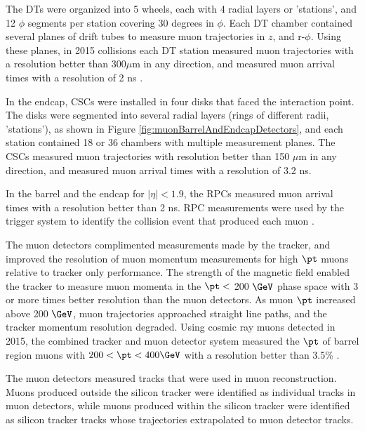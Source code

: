 The DTs were organized into 5 wheels, each with 4 radial layers or 'stations', and 12 $\phi$ segments per 
station covering 30 degrees in $\phi$.  Each DT chamber contained several planes of drift tubes to measure 
muon trajectories in $z$, and r-$\phi$.  Using these planes, in 2015 collisions each DT station measured muon trajectories 
with a resolution better than 300$\mu$m in any direction, and measured muon arrival times with a resolution of 2 ns \cite{cmsMuonRecoRunTwo}.  

In the endcap, CSCs were installed in four disks that faced the interaction point.  
The disks were segmented into several radial layers (rings of different radii, 'stations'), as shown in Figure \ref{fig:muonBarrelAndEndcapDetectors}, 
and each station contained 18 or 36 chambers with multiple measurement planes.  The CSCs measured muon trajectories with 
resolution better than 150 $\mu$m in any direction, and measured muon arrival times with a resolution of 3.2 ns.  

In the barrel and the endcap for $|\eta| < 1.9$, the RPCs measured muon arrival times with a resolution better than 
2 ns.  RPC measurements were used by the trigger system to identify the collision event that produced each muon \cite{cmsMuonRecoRunTwo}.

The muon detectors complimented measurements made by the tracker, and improved the resolution of muon 
momentum measurements for high $\pt$ muons relative to tracker only performance.  The strength of the magnetic field 
enabled the tracker to measure muon momenta in the $\pt <$ 200 $\GeV$ phase space with 3 or more times better resolution 
than the muon detectors.  As muon $\pt$ increased above 200 $\GeV$, muon trajectories approached straight line paths, 
and the tracker momentum resolution degraded.  Using cosmic ray muons detected in 2015, the combined tracker and muon 
detector system measured the $\pt$ of barrel region muons with $200 < \pt < 400 \GeV$ with a resolution better than 
3.5\% \cite{cmsMuonRecoRunTwo}.

The muon detectors measured tracks that were used in muon reconstruction.  Muons produced outside the silicon tracker 
were identified as individual tracks in muon detectors, while muons produced within the silicon tracker were identified 
as silicon tracker tracks whose trajectories extrapolated to muon detector tracks.


